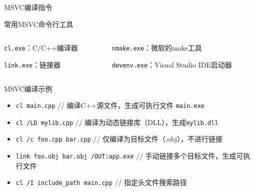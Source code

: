\documentclass[UTF8,aspectratio=169]{beamer}
\begin{document}
\begin{frame}{MSVC编译指令}
    \begin{ytublock}{常用MSVC命令行工具}
        \begin{itemize}
            \begin{columns}
                \begin{column}{0.48\textwidth}
                    \item \texttt{cl.exe}：C/C++编译器
                    \item \texttt{link.exe}：链接器
                \end{column}
                \begin{column}{0.48\textwidth}
                    \item \texttt{nmake.exe}：微软的make工具
                    \item \texttt{devenv.exe}：Visual Studio IDE启动器
                \end{column}
            \end{columns}
        \end{itemize}
    \end{ytublock}
    \begin{ytublock}{MSVC编译示例}
        \begin{itemize}
            \item \texttt{cl main.cpp} \hspace{1em} // 编译C++源文件，生成可执行文件 \texttt{main.exe}
            \item \texttt{cl /LD mylib.cpp} \hspace{1em} // 编译为动态链接库（DLL），生成\texttt{mylib.dll}
            \item \texttt{cl /c foo.cpp bar.cpp} \hspace{1em} // 仅编译为目标文件（.obj），不进行链接
            \item \texttt{link foo.obj bar.obj /OUT:app.exe} \hspace{1em} // 手动链接多个目标文件，生成可执行文件
            \item \texttt{cl /I include\_path main.cpp} \hspace{1em} // 指定头文件搜索路径
        \end{itemize}
    \end{ytublock}
\end{frame}
\end{document}
